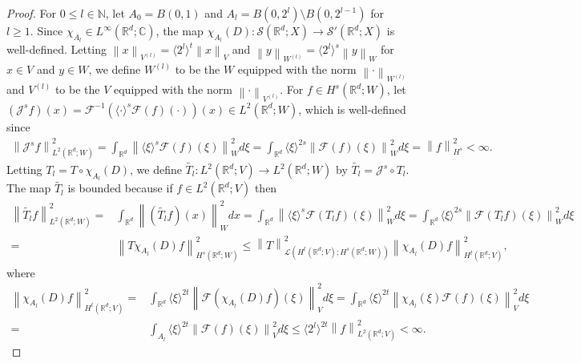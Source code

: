 \documentclass[11pt,letterpaper,reqno]{amsart}
\numberwithin{equation}{section}
\newcommand{\norm}[1]{\left\lVert#1\right\rVert}
\begin{document}
\begin{proof}
    For \(0 \leq l \in \mathbb{N}\), let $A_0 = B(0,1)$ and $A_{l} = B(0,2^{l}) \setminus B(0,2^{l-1})$ for $l \geq 1$.     Since \(\chi_{A_{l}} \in L^{\infty}(\mathbb{R}^{d};\mathbb{C})\), the map \(\chi_{A_{l}}(D):\mathscr{S}(\mathbb{R}^{d};X) \to \mathscr{S}'(\mathbb{R}^{d};X)\) is well-defined. Letting \(\norm{x}_{V^{(l)}}=\langle 2^{l} \rangle^{t}\norm{x}_{V}\) and \(\norm{y}_{W^{(l)}}=\langle 2^{l} \rangle^{s}\norm{y}_{W}\) for \(x \in V\) and \(y \in W\), we define \(W^{(l)}\) to be the \(W\) equipped with the norm \(\norm{\cdot}_{W^{(l)}}\) and \(V^{(l)}\) to be the \(V\) equipped with the norm \(\norm{\cdot}_{V^{(l)}}\). For \(f \in H^{s}(\mathbb{R}^{d};W)\), let \((\mathcal{J}^{s}f)(x)=\mathcal{F}^{-1}(\langle \cdot \rangle^{s}\mathcal{F}(f)(\cdot))(x) \in L^{2}(\mathbb{R}^{d};W)\), which is well-defined since
    \begin{align}
        \norm{\mathcal{J}^{s}f}_{L^{2}(\mathbb{R}^{d};W)}^{2}=\int_{\mathbb{R}^{d}}\norm{\langle \xi \rangle^{s}\mathcal{F}(f)(\xi)}_{W}^{2}d\xi=\int_{\mathbb{R}^{d}}\langle \xi \rangle^{2s}\norm{\mathcal{F}(f)(\xi)}_{W}^{2}d\xi=\norm{f}_{H^{s}}^{2}<\infty.
    \end{align}
    Letting \(T_{l}=T \circ \chi_{A_{l}}(D)\), we define \(\widetilde{T_{l}}:L^{2}(\mathbb{R}^{d};V) \to L^{2}(\mathbb{R}^{d};W)\) by \(\widetilde{T_{l}}=\mathcal{J}^{s}\circ T_{l}\). The map \(\widetilde{T_{l}}\) is bounded because if \(f \in L^{2}(\mathbb{R}^{d};V)\) then
    \begin{align}
        \norm{\widetilde{T_{l}}f}_{L^{2}(\mathbb{R}^{d};W)}^{2}=&\int_{\mathbb{R}^{d}}\norm{(\widetilde{T_{l}}f)(x)}_{W}^{2}dx =\int_{\mathbb{R}^{d}}\norm{\langle \xi \rangle^{s}\mathcal{F}(T_{l}f)(\xi)}_{W}^{2}d\xi =\int_{\mathbb{R}^{d}}\langle\xi\rangle^{2s}\norm{\mathcal{F}(T_{l}f)(\xi)}_{W}^{2}d\xi \nonumber \\
        =& \norm{T\chi_{A_{l}}(D)f}_{H^{s}(\mathbb{R}^{d};W)}^{2} \leq \norm{T}_{\mathcal{L}(H^{t}(\mathbb{R}^{d};V);H^{s}(\mathbb{R}^{d};W))}^{2}\norm{\chi_{A_{l}}(D)f}_{H^{t}(\mathbb{R}^{d};V)}^{2},
    \end{align}
    where
    \begin{align}
        \norm{\chi_{A_{l}}(D)f}_{H^{t}(\mathbb{R}^{d};V)}^{2}=&\int_{\mathbb{R}^{d}}\langle \xi\rangle^{2t}\norm{\mathcal{F}(\chi_{A_{l}}(D)f)(\xi)}_{V}^{2}d\xi =\int_{\mathbb{R}^{d}}\langle\xi \rangle^{2t}\norm{\chi_{A_{l}}(\xi)\mathcal{F}(f)(\xi)}_{V}^{2}d\xi \nonumber\\
        =&\int_{A_{l}}\langle \xi \rangle^{2t}\norm{\mathcal{F}(f)(\xi)}_{V}^{2}d\xi \leq \langle 2^{l} \rangle^{2t}\norm{f}_{L^{2}(\mathbb{R}^{d};V)}^{2}<\infty.

\end{align}
\end{proof}
\end{document}

